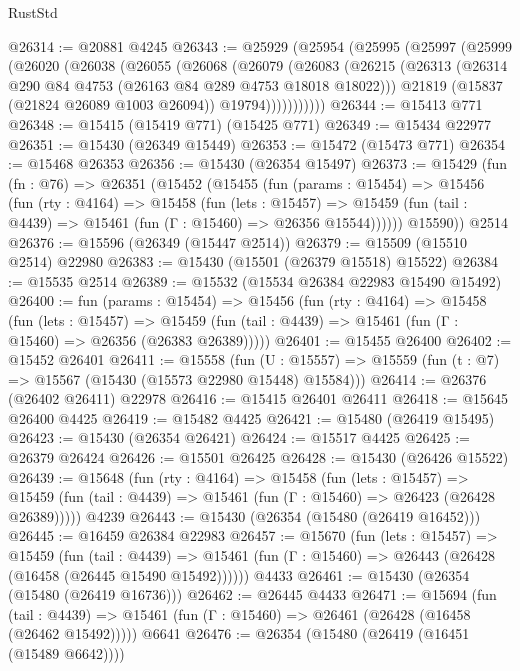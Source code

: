 \begin{lexlean}{RustStd}
\begin{coremodule}
@26314 := @20881 @4245
@26343 := @25929
    (@25954
      (@25995
        (@25997
          (@25999
            (@26020
              (@26038
                (@26055
                  (@26068
                    (@26079
                      (@26083
                        (@26215
                          (@26313 (@26314 @290 @84 @4753 (@26163 @84 @289 @4753 @18018 @18022)))
                          @21819
                          (@15837 (@21824 @26089 @1003 @26094))
                          @19794)))))))))))
@26344 := @15413 @771
@26348 := @15415 (@15419 @771) (@15425 @771)
@26349 := @15434 @22977
@26351 := @15430 (@26349 @15449)
@26353 := @15472 (@15473 @771)
@26354 := @15468 @26353
@26356 := @15430 (@26354 @15497)
@26373 := @15429
    (fun (fn : @76) =>
    @26351
      (@15452
        (@15455
          (fun (params : @15454) =>
          @15456
            (fun (rty : @4164) =>
            @15458
              (fun (lets : @15457) =>
              @15459 (fun (tail : @4439) => @15461 (fun (Γ : @15460) => @26356 @15544))))))
        @15590))
    @2514
@26376 := @15596 (@26349 (@15447 @2514))
@26379 := @15509 (@15510 @2514) @22980
@26383 := @15430 (@15501 (@26379 @15518) @15522)
@26384 := @15535 @2514
@26389 := @15532 (@15534 @26384 @22983 @15490 @15492)
@26400 := fun (params : @15454) =>
  @15456
    (fun (rty : @4164) =>
    @15458
      (fun (lets : @15457) =>
      @15459 (fun (tail : @4439) => @15461 (fun (Γ : @15460) => @26356 (@26383 @26389)))))
@26401 := @15455 @26400
@26402 := @15452 @26401
@26411 := @15558
    (fun (U : @15557) => @15559 (fun (t : @7) => @15567 (@15430 (@15573 @22980 @15448) @15584)))
@26414 := @26376 (@26402 @26411) @22978
@26416 := @15415 @26401 @26411
@26418 := @15645 @26400 @4425
@26419 := @15482 @4425
@26421 := @15480 (@26419 @15495)
@26423 := @15430 (@26354 @26421)
@26424 := @15517 @4425
@26425 := @26379 @26424
@26426 := @15501 @26425
@26428 := @15430 (@26426 @15522)
@26439 := @15648
    (fun (rty : @4164) =>
    @15458
      (fun (lets : @15457) =>
      @15459 (fun (tail : @4439) => @15461 (fun (Γ : @15460) => @26423 (@26428 @26389)))))
    @4239
@26443 := @15430 (@26354 (@15480 (@26419 @16452)))
@26445 := @16459 @26384 @22983
@26457 := @15670
    (fun (lets : @15457) =>
    @15459
      (fun (tail : @4439) =>
      @15461 (fun (Γ : @15460) => @26443 (@26428 (@16458 (@26445 @15490 @15492))))))
    @4433
@26461 := @15430 (@26354 (@15480 (@26419 @16736)))
@26462 := @26445 @4433
@26471 := @15694
    (fun (tail : @4439) => @15461 (fun (Γ : @15460) => @26461 (@26428 (@16458 (@26462 @15492)))))
    @6641
@26476 := @26354 (@15480 (@26419 (@16451 (@15489 @6642))))

\end{coremodule}
\end{lexlean}
